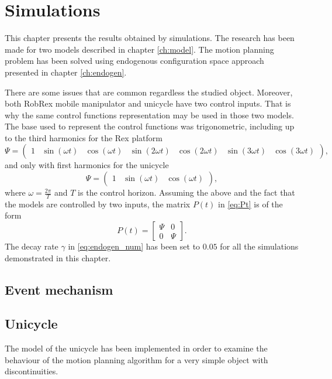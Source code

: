 \chapter{Simulations}
This chapter presents the results obtained by simulations. The research has been made for two models
described in chapter \ref{ch:model}. The motion planning problem has been solved using endogenous
configuration space approach presented in chapter \ref{ch:endogen}.

There are some issues that are common regardless the studied object. Moreover,
both RobRex mobile manipulator and unicycle have two control inputs. That is why
the same control functions representation may be used in those two models.
The base used to represent the control functions was trigonometric, including up to the third harmonics
for the Rex platform
\begin{equation}
\Psi=\begin{pmatrix}
1 & \sin(\omega t) & \cos(\omega t)& \sin(2\omega t) & \cos(2\omega t)& \sin(3\omega t) & \cos(3\omega t)
\end{pmatrix},
\end{equation}
and only with first harmonics for the unicycle
\begin{equation}
\Psi=\begin{pmatrix}
1 & \sin(\omega t) & \cos(\omega t)
\end{pmatrix},
\end{equation}
where $\omega=\frac{2\pi}{T}$ and $T$ is the control horizon. Assuming the above and
the fact that the models are controlled by two inputs, the
matrix $P(t)$ in \eqref{eq:Pt} is of the form
\begin{equation}
P(t)=\begin{bmatrix}
\Psi & 0\\
0 & \Psi
\end{bmatrix}.
\end{equation}
The decay rate $\gamma$ in \eqref{eq:endogen_num} has been set to $0.05$ for all
the simulations demonstrated in this chapter.

\section{Event mechanism}


\section{Unicycle}
The model of the unicycle has been implemented in order to examine the behaviour
of the motion planning algorithm for a very simple object with discontinuities. 

